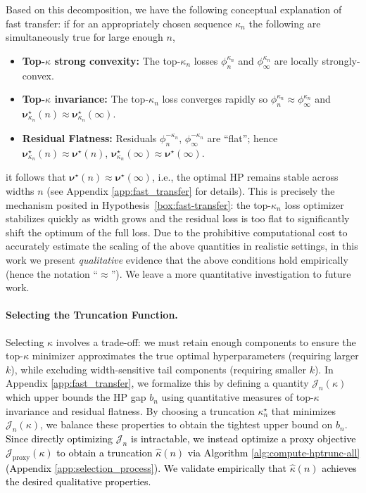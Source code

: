 \documentclass{article} %
\newcommand{\rev}[1]{\textcolor{black}{#1}}
\newcommand{\bhp}{\bm{\nu}}                       %
\newcommand{\hptrunc}{\kappa}
\newcommand{\decompobj}{\mathcal{J}}
\begin{document}
Based on this decomposition, we have the following conceptual explanation of fast transfer: if for an appropriately chosen sequence $\hptrunc_n$ the following are simultaneously true for large enough $n$, 
\begin{itemize}[leftmargin=*]
    \item \textbf{Top-$\hptrunc$ strong convexity:} The top-$\hptrunc_n$ losses $\phi_n^{\hptrunc_n}$ and $\phi_\infty^{\hptrunc_n}$ are locally strongly-convex.
    \item \textbf{Top-$\hptrunc$ invariance:} The top-$\hptrunc_n$ loss converges rapidly so $\phi_n^{\hptrunc_n} \approx \phi_\infty^{\hptrunc_n}$ and $\bhp^\star_{\hptrunc_n}(n) \approx \bhp^\star_{\hptrunc_n}(\infty)$.
    \item \textbf{Residual Flatness:} Residuals $\phi_n^{-\hptrunc_n}$, $\phi_\infty^{-\hptrunc_n}$ are ``flat''; hence $\bhp_{\hptrunc_n}^\star(n) \approx \bhp^\star(n)$, $\bhp_{\hptrunc_n}^\star(\infty) \approx \bhp^\star(\infty)$.
\end{itemize} 
it follows that $\bhp^\star(n) \approx \bhp^\star(\infty)$, i.e., the optimal HP remains stable across widths $n$ (see Appendix \ref{app:fast_transfer} for details). This is precisely the mechanism posited in Hypothesis~\ref{box:fast-transfer}: the top-$\hptrunc_n$ loss optimizer stabilizes quickly as width grows and the residual loss is too flat to significantly shift the optimum of the full loss. Due to the prohibitive computational cost to accurately estimate the scaling of the above quantities in realistic settings, in this work we present \textit{qualitative} evidence that the above conditions hold empirically (hence the notation ``$\approx$''). We leave a more quantitative investigation to future work. 

\paragraph{Selecting the Truncation Function.}
Selecting $\hptrunc$ involves a trade-off: we must retain enough components to ensure the top-$\hptrunc$ minimizer approximates the true optimal hyperparameters (requiring larger $k$), while excluding  width-sensitive tail components (requiring smaller $k$). In Appendix \ref{app:fast_transfer}, we formalize this by defining a quantity $\decompobj_n(\hptrunc)$ which upper bounds the HP gap $b_n$ using quantitative measures of top-$\hptrunc$ invariance and residual flatness. By choosing a truncation $\hptrunc_n^\star$ that minimizes $\decompobj_n(\hptrunc)$, we balance these properties to obtain the tightest upper bound on $b_n$. \rev{Since directly optimizing $\decompobj_n$ is intractable, we instead optimize a proxy objective $\decompobj_{\mathrm{proxy}}(\hptrunc)$ to obtain a truncation $\hat{\hptrunc}(n)$ via Algorithm \ref{alg:compute-hptrunc-all} (Appendix \ref{app:selection_process}). We validate empirically that $\hat{\hptrunc}(n)$ achieves the desired qualitative properties.}
\end{document}
